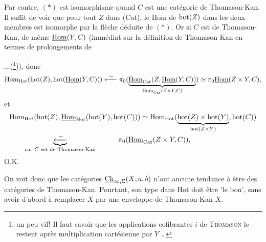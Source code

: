 Par contre, $(*)$ est isomorphisme quand $C$ est une catégorie de Thomason-Kan. Il suffit de voir que pour tout $Z$ dans (Cat), le Hom de $\mathrm{hot}(Z)$ dans les deux membres est isomorphe par la flèche déduite de $(*)$. Or si $C$ est de Thomason-Kan, de même $\underline{\mathrm{Hom}}(Y,C)$ (immédiat sur la définition de Thomason-Kan en termes de prolongements de
$\ldots$(\footnote[29]{un peu vif! Il faut savoir que les applications cofibrantes $i$ de \textsc{Thomason} le restent après multiplication cartésienne par $Y$ \ldots})), donc
\[
\mathrm{Hom}_{\mathrm{Hot}}(\hot(Z),\hot(\uHom(Y,C)))\xleftarrow{\ \sim\ }\pi_0(\underbrace{\uHom_{\mathrm{Cat}}(Z,\uHom(Y,C))}_{\uHom_{\mathrm{Cat}}(Z\times Y,C)})\simeq\pi_0\uHom(Z\times Y,C), %
\]
et
\[
\begin{aligned}
&\mathrm{Hom}_{\mathrm{Hot}}(\mathrm{hot}(Z),\underline{\mathrm{Hom}}_{\mathrm{Hot}}(\mathrm{hot}(Y),\mathrm{hot}(C)))\simeq\mathrm{Hom}_{\mathrm{Hot}}(\underbrace{\mathrm{hot}(Z)\times\mathrm{hot}(Y)}_{\mathrm{hot}(Z\times Y)},\mathrm{hot}(C))\\
&\qquad\underbrace{\xleftarrow{\ \sim\ }}_{\text{car $C$ est de Thomason-Kan}}\qquad\quad\pi_0(\underline{\mathrm{Hom}}_{\mathrm{Cat}}(Z\times Y,C)),
\end{aligned}
\]
O.K.

On voit donc que les catégories $\underline{\mathrm{Ch}}_{\infty,\Sigma}(X;a,b)$ n'ont aucune tendance à être des catégories de Thomason-Kan. Pourtant, son type dans Hot doit être `le bon', sans avoir d'abord à remplacer $X$ par une enveloppe de Thomason-Kan $\bar{X}$.

